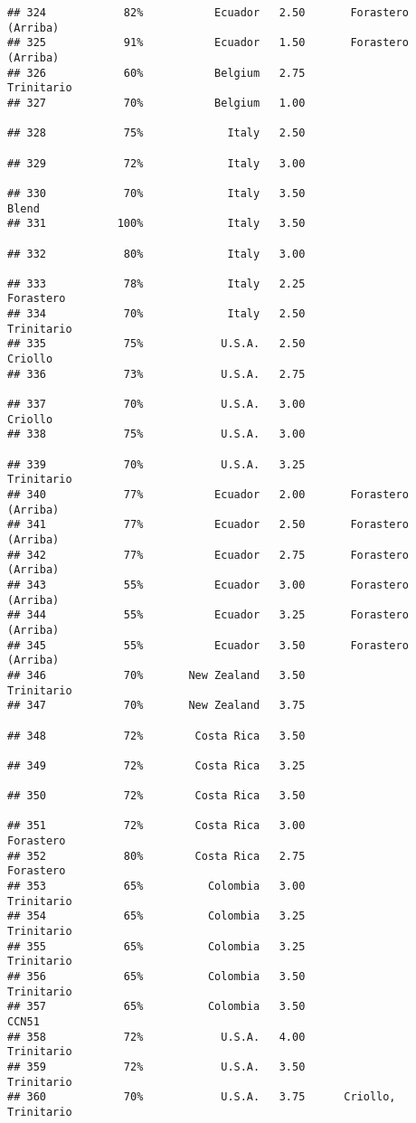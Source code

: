 \documentclass[
]{article}
\begin{document}
\begin{verbatim}
## 324            82%           Ecuador   2.50       Forastero (Arriba)
## 325            91%           Ecuador   1.50       Forastero (Arriba)
## 326            60%           Belgium   2.75               Trinitario
## 327            70%           Belgium   1.00                         
## 328            75%             Italy   2.50                         
## 329            72%             Italy   3.00                         
## 330            70%             Italy   3.50                    Blend
## 331           100%             Italy   3.50                         
## 332            80%             Italy   3.00                         
## 333            78%             Italy   2.25                Forastero
## 334            70%             Italy   2.50               Trinitario
## 335            75%            U.S.A.   2.50                  Criollo
## 336            73%            U.S.A.   2.75                         
## 337            70%            U.S.A.   3.00                  Criollo
## 338            75%            U.S.A.   3.00                         
## 339            70%            U.S.A.   3.25               Trinitario
## 340            77%           Ecuador   2.00       Forastero (Arriba)
## 341            77%           Ecuador   2.50       Forastero (Arriba)
## 342            77%           Ecuador   2.75       Forastero (Arriba)
## 343            55%           Ecuador   3.00       Forastero (Arriba)
## 344            55%           Ecuador   3.25       Forastero (Arriba)
## 345            55%           Ecuador   3.50       Forastero (Arriba)
## 346            70%       New Zealand   3.50               Trinitario
## 347            70%       New Zealand   3.75                         
## 348            72%        Costa Rica   3.50                         
## 349            72%        Costa Rica   3.25                         
## 350            72%        Costa Rica   3.50                         
## 351            72%        Costa Rica   3.00                Forastero
## 352            80%        Costa Rica   2.75                Forastero
## 353            65%          Colombia   3.00               Trinitario
## 354            65%          Colombia   3.25               Trinitario
## 355            65%          Colombia   3.25               Trinitario
## 356            65%          Colombia   3.50               Trinitario
## 357            65%          Colombia   3.50                    CCN51
## 358            72%            U.S.A.   4.00               Trinitario
## 359            72%            U.S.A.   3.50               Trinitario
## 360            70%            U.S.A.   3.75      Criollo, Trinitario

\end{verbatim}
\end{document}
